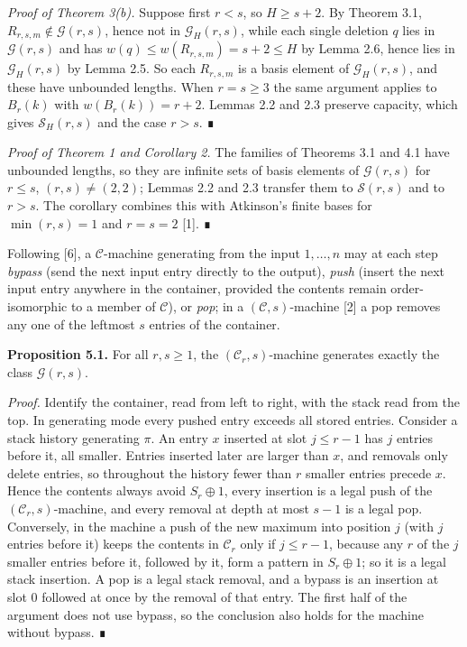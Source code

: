 \documentclass[11pt,letterpaper]{article}
\begin{document}
\emph{Proof of Theorem 3(b).} Suppose first \(r<s\), so \(H\ge s+2\). By
Theorem 3.1, \(R_{r,s,m}\notin\mathcal G(r,s)\), hence not in
\(\mathcal G_H(r,s)\), while each single deletion \(q\) lies in
\(\mathcal G(r,s)\) and has \(w(q)\le w(R_{r,s,m})=s+2\le H\) by Lemma
2.6, hence lies in \(\mathcal G_H(r,s)\) by Lemma 2.5. So each
\(R_{r,s,m}\) is a basis element of \(\mathcal G_H(r,s)\), and these
have unbounded lengths. When \(r=s\ge3\) the same argument applies to
\(B_r(k)\) with \(w(B_r(k))=r+2\). Lemmas 2.2 and 2.3 preserve capacity,
which gives \(\mathcal S_H(r,s)\) and the case \(r>s\). ∎

\emph{Proof of Theorem 1 and Corollary 2.} The families of Theorems 3.1
and 4.1 have unbounded lengths, so they are infinite sets of basis
elements of \(\mathcal G(r,s)\) for \(r\le s\), \((r,s)\ne(2,2)\);
Lemmas 2.2 and 2.3 transfer them to \(\mathcal S(r,s)\) and to \(r>s\).
The corollary combines this with Atkinson's finite bases for
\(\min(r,s)=1\) and \(r=s=2\) {[}1{]}. ∎

Following {[}6{]}, a \(\mathcal C\)-machine generating from the input
\(1,\dots,n\) may at each step \emph{bypass} (send the next input entry
directly to the output), \emph{push} (insert the next input entry
anywhere in the container, provided the contents remain order-isomorphic
to a member of \(\mathcal C\)), or \emph{pop}; in a
\((\mathcal C,s)\)-machine {[}2{]} a pop removes any one of the leftmost
\(s\) entries of the container.

\textbf{Proposition 5.1.} For all \(r,s\ge1\), the
\((\mathcal C_r,s)\)-machine generates exactly the class
\(\mathcal G(r,s)\).

\emph{Proof.} Identify the container, read from left to right, with the
stack read from the top. In generating mode every pushed entry exceeds
all stored entries. Consider a stack history generating \(\pi\). An
entry \(x\) inserted at slot \(j\le r-1\) has \(j\) entries before it,
all smaller. Entries inserted later are larger than \(x\), and removals
only delete entries, so throughout the history fewer than \(r\) smaller
entries precede \(x\). Hence the contents always avoid \(S_r\oplus1\),
every insertion is a legal push of the \((\mathcal C_r,s)\)-machine, and
every removal at depth at most \(s-1\) is a legal pop. Conversely, in
the machine a push of the new maximum into position \(j\) (with \(j\)
entries before it) keeps the contents in \(\mathcal C_r\) only if
\(j\le r-1\), because any \(r\) of the \(j\) smaller entries before it,
followed by it, form a pattern in \(S_r\oplus1\); so it is a legal stack
insertion. A pop is a legal stack removal, and a bypass is an insertion
at slot \(0\) followed at once by the removal of that entry. The first
half of the argument does not use bypass, so the conclusion also holds
for the machine without bypass. ∎
\end{document}
